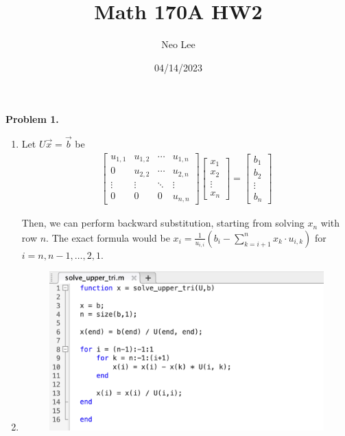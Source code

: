 \documentclass{article}
\title{Math 170A HW2}
\author{Neo Lee}
\date{04/14/2023}
\begin{document}
 

\maketitle 

\textbf{Problem 1.}
\begin{enumerate}[label={\alph*)}]
    \item 
    Let $U\vec{x}=\vec{b}$ be
    \begin{align}
        \begin{bmatrix}
            u_{1,1} & u_{1,2} & \cdots & u_{1,n} \\
            0 & u_{2,2} & \cdots & u_{2,n} \\
            \vdots & \vdots & \ddots & \vdots \\
            0 & 0 & 0 & u_{n,n}
        \end{bmatrix}
        \begin{bmatrix}
            x_1 \\
            x_2 \\
            \vdots \\
            x_n
        \end{bmatrix}
        = 
        \begin{bmatrix}
            b_1 \\
            b_2 \\
            \vdots \\
            b_n
        \end{bmatrix}
        \nonumber
    \end{align}

    Then, we can perform backward substitution, starting from solving $x_n$ with row $n$.
    The exact formula would be $x_i = \frac{1}{u_{i,i}}\left(b_i - \sum\limits_{k=i+1}^nx_k\cdot u_{i,k}\right)$ for $i = {n, n-1, \dots , 2, 1}$.

    \item \qquad
    \begin{figure}[h]
        \centering
        \includegraphics*[scale=0.5]{solve_upper_tri.png}
    \end{figure}


\end{enumerate}
\end{document}
